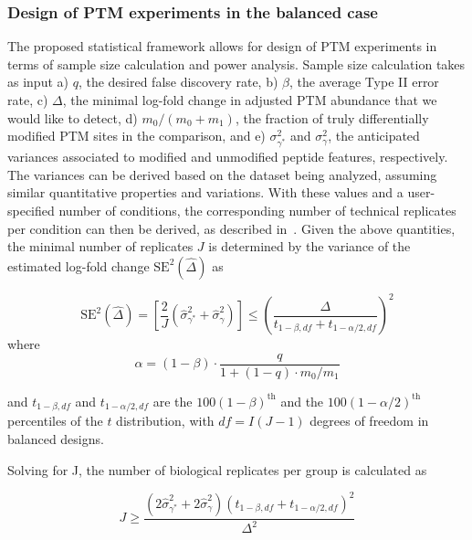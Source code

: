 \documentclass[mcp]{article}
\numberwithin{table}{section}
\begin{document}
\subsubsection*{Design of PTM experiments in the balanced case}
\label{sec:design}

The proposed statistical framework allows for design of PTM experiments in terms of sample size calculation and power analysis. 
Sample size calculation takes as input a) $q$, the desired false discovery rate, b) $\beta$, the average Type II error rate, c) $\Delta$, the minimal log-fold change in adjusted PTM abundance that we would like to detect, d) $m_0 / (m_0 + m_1)$, the fraction of truly differentially modified PTM sites in the comparison, and e) $\sigma_{\gamma^{\ast}}^{2}$ and $\sigma_{\gamma}^{2}$, the anticipated variances associated to modified and unmodified peptide features, respectively. The variances can be derived based on the dataset being analyzed, assuming similar quantitative properties and variations. With these values and a user-specified number of conditions, the corresponding number of technical replicates per condition can then be derived, as described in~\cite{kutner_etal_04a}. Given the above quantities, the minimal number of replicates $J$ is determined by the variance of the estimated log-fold change $\mathrm{SE}^{2}(\hat{\Delta})$ as

\begin{equation}
\mathrm{SE}^{2}(\hat{\Delta}) = \left[ \frac{2}{J} \left( \hat{\sigma}_{\gamma^{\ast}}^{2} + \hat{\sigma}_{\gamma}^{2} \right) \right]
\leq \left( \frac{\Delta}{t_{1-\beta, df} + t_{1-\alpha /2, df}} \right)^{2}
\end{equation}
where 
\begin{equation}
\alpha = (1 - \beta) \cdot \frac{q}{1 + (1-q) \cdot m_0 / m_1}
\end{equation}

and $t_{1-\beta, df}$ and $t_{1-\alpha /2, df}$ are the $100(1-\beta)^{\text{th}}$ and the $100(1-\alpha /2)^{\text{th}}$ percentiles of the $t$ distribution, with $df = I(J-1)$ degrees of freedom in balanced designs. 

Solving for J, the number of biological replicates per group is calculated as 

\begin{equation}
J \geq \frac{(2\hat{\sigma}_{\gamma^{\ast}}^{2} + 2\hat{\sigma}_{\gamma}^{2})(t_{1-\beta, df} + t_{1-\alpha /2, df})^2}{\Delta^2}
\end{equation}
\end{document}

